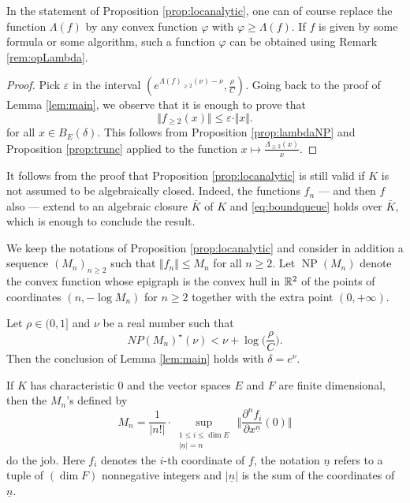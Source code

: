 \documentclass{lms}
\DeclareMathOperator{\NP}{NP}
\begin{document}
\begin{rem}
In the statement of Proposition \ref{prop:locanalytic}, one can of 
course replace the function $\Lambda(f)$ by any convex function 
$\varphi$ with $\varphi \geq \Lambda(f)$. If $f$ is given by some
formula or some algorithm, such a function $\varphi$ can be obtained
using Remark \ref{rem:opLambda}.
\end{rem}

\begin{proof}
Pick $\varepsilon$ in the interval $(e^{\Lambda(f)_{\geq 2} (\nu) - \nu}, 
\frac \rho C)$. Going back to the proof of Lemma \ref{lem:main}, we 
observe that it is enough to prove that
\begin{equation}
\label{eq:boundqueue} 
\Vert f_{\geq 2}(x) \Vert \leq \varepsilon \cdot \Vert x \Vert.
\end{equation}
for all $x \in B_E(\delta)$.
This follows from Proposition \ref{prop:lambdaNP} and Proposition
\ref{prop:trunc} applied to the function $x \mapsto \frac {\Lambda_{\geq 
2}(x)} x$.
\end{proof}

\begin{rem}
It follows from the proof that Proposition \ref{prop:locanalytic} is 
still valid if $K$ is not assumed to be algebraically closed. Indeed, 
the functions $f_n$ --- and then $f$ also --- extend to an algebraic
closure $\bar K$ of $K$ and \eqref{eq:boundqueue} holds over $\bar 
K$, which is enough to conclude the result.
\end{rem}

\begin{cor}
We keep the notations of Proposition \ref{prop:locanalytic} and consider 
in addition a sequence $(M_n)_{n \geq 2}$ such that $\Vert f_n \Vert 
\leq M_n$ for all $n \geq 2$. Let $\NP(M_n)$ denote the convex function
whose epigraph is the convex hull in $\mathbb R^2$ of the points of coordinates
$(n, -\log M_n)$ for $n \geq 2$ together with the extra point $(0,
+\infty)$.

Let $\rho \in (0, 1]$ and $\nu$ be a real number such that 
$$NP(M_n)^\star (\nu) < \nu + \log \Big( \frac \rho C \Big).$$
Then the conclusion of Lemma \ref{lem:main} holds with $\delta = e^\nu$.
\end{cor}

\begin{rem}
If $K$ has characteristic $0$ and the vector spaces $E$ and $F$ are
finite dimensional, then the $M_n$'s defined by
$$M_n = \frac 1 {|n!|} \cdot 
\sup_{\substack{1 \leq i \leq \dim E \\ \vert \underline n
\vert = n}} \,
\Big\Vert \frac{\partial^n f_i}{\partial x^{\underline n}}(0) 
\Big\Vert$$
do the job. Here $f_i$ denotes the $i$-th coordinate of $f$, the
notation $\underline n$ refers to a tuple of $(\dim F)$ nonnegative
integers and $\vert \underline n \vert$ is the sum of the coordinates
of $\underline n$.
\end{rem}
\end{document}
